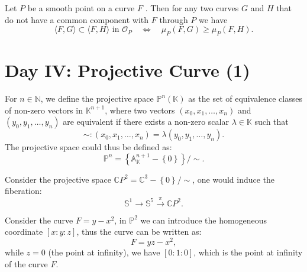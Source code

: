 \documentclass[10pt]{article}
\begin{document}
\begin{theorem}
  Let $ P$  be a smooth point on a curve $ F$ . Then for any two curves $G$  and $H$  that do not have a common component with $F$ through $P$  we have
  \begin{equation*}
    \langle F,G\rangle\subset\langle F,H\rangle\text{ in }\mathscr{O}_P\quad\Leftrightarrow\quad\mu_P(F,G)\geq\mu_P(F,H).
  \end{equation*}
\end{theorem}

\section{Day IV: Projective Curve (1)}

\begin{definition}
  For $ n \in \mathbb{N}$, we define the projective space $ \mathbb{P}^{n}(\mathbb{K})$ as the set of equivalence classes of non-zero vectors in $ \mathbb{K}^{n+1}$, where two vectors $ (x_0, x_1, \ldots, x_n)$ and $ (y_0, y_1, \ldots, y_n)$ are equivalent if there exists a non-zero scalar $ \lambda \in \mathbb{K}$ such that
  \begin{equation*}
    \sim : (x_0, x_1, \ldots, x_n) = \lambda (y_0, y_1, \ldots, y_n).
  \end{equation*}
  The projective space could thus be defined as:
  \begin{equation*}
    \mathbb{P}^{n} = \left\{ \mathbb{A}_{\mathbb{K}}^{n+1} - \left\{ 0 \right\} \right\}/\sim .
  \end{equation*}
\end{definition}

\begin{example}
  Consider the projective space $ \mathbb{C}P^{2} = \mathbb{C}^{3} - \left\{ 0 \right\} / \sim $, one would induce the fiberation:
  \begin{equation*}
    \mathbb{S}^{1} \rightarrow \mathbb{S}^{5} \xrightarrow{\pi} \mathbb{C}P^{2}.
  \end{equation*}
\end{example}

\begin{example}
  Consider the curve $ F = y - x^{2}$, in $ \mathbb{P}^{2}$ we can introduce the homogeneous coordinate $[x:y:z]$, thus the curve can be written as:
  \begin{equation*}
    F = yz - x^{2},
  \end{equation*}
  while $ z = 0$ (the point at infinity), we have $[0:1:0]$, which is the point at infinity of the curve $ F$.
\end{example}
\end{document}
